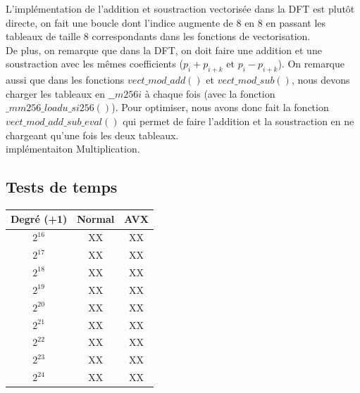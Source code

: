 \documentclass[12pt, a4paper]{article}
\begin{document}
L'implémentation de l'addition et soustraction vectorisée dans la DFT est plutôt directe, on fait une boucle dont l'indice augmente de 8 en 8 en passant les tableaux de taille 8 correspondants dans les fonctions de vectorisation. \\
De plus, on remarque que dans la DFT, on doit faire une addition et une soustraction avec les mêmes coefficients ($p_i+p_{i+k}$ et $p_i-p_{i+k}$). On remarque aussi que dans les fonctions $vect\_mod\_add()$ et $vect\_mod\_sub()$, nous devons charger les tableaux en $\_\_m256i$ à chaque fois (avec la fonction $\_mm256\_loadu\_si256()$). Pour optimiser, nous avons donc fait la fonction $vect\_mod\_add\_sub\_eval()$ qui permet de faire l'addition et la soustraction en ne chargeant qu'une fois les deux tableaux. \\
implémentaiton Multiplication.

\subsection{Tests de temps}

\begin{center}
\begin{tabular}{||c c c||}
\hline
Degré (+1) & Normal & AVX \\
\hline\hline
$2^{16}$ & XX & XX \\
\hline
$2^{17}$ & XX & XX \\
\hline
$2^{18}$ & XX & XX \\
\hline
$2^{19}$ & XX & XX \\
\hline
$2^{20}$ & XX & XX \\
\hline
$2^{21}$ & XX & XX \\
\hline
$2^{22}$ & XX & XX \\
\hline
$2^{23}$ & XX & XX \\
\hline
$2^{24}$ & XX & XX \\
\hline
\end{tabular}
\end{center}



\nocite{*}
\end{document}
